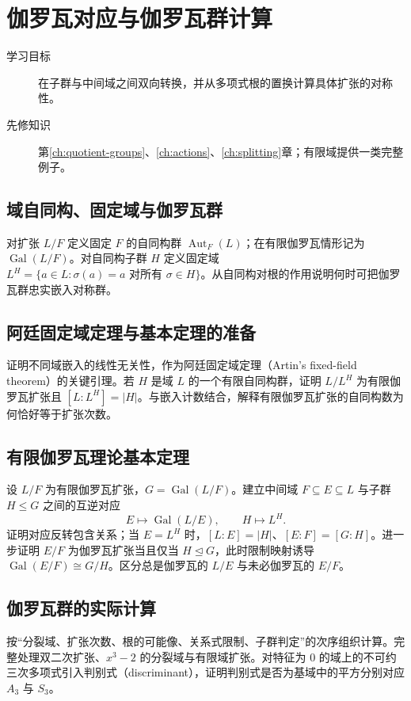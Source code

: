 \documentclass[UTF8,12pt,a4paper,fontset=fandol]{ctexbook}
\begin{document}
\chapter{伽罗瓦对应与伽罗瓦群计算}\label{ch:galois}

\begin{description}
  \item[学习目标] 在子群与中间域之间双向转换，并从多项式根的置换计算具体扩张的对称性。
  \item[先修知识] 第\ref{ch:quotient-groups}、\ref{ch:actions}、\ref{ch:splitting}章；有限域提供一类完整例子。
\end{description}

\section{域自同构、固定域与伽罗瓦群}
对扩张 $L/F$ 定义固定 $F$ 的自同构群 $\operatorname{Aut}_F(L)$；在有限伽罗瓦情形记为 $\operatorname{Gal}(L/F)$。对自同构子群 $H$ 定义固定域 $L^H=\{a\in L:\sigma(a)=a\text{ 对所有 }\sigma\in H\}$。从自同构对根的作用说明何时可把伽罗瓦群忠实嵌入对称群。

\section{阿廷固定域定理与基本定理的准备}
证明不同域嵌入的线性无关性，作为阿廷固定域定理（Artin's fixed-field theorem）的关键引理。若 $H$ 是域 $L$ 的一个有限自同构群，证明 $L/L^H$ 为有限伽罗瓦扩张且 $[L:L^H]=|H|$。与嵌入计数结合，解释有限伽罗瓦扩张的自同构数为何恰好等于扩张次数。

\section{有限伽罗瓦理论基本定理}
设 $L/F$ 为有限伽罗瓦扩张，$G=\operatorname{Gal}(L/F)$。建立中间域 $F\subseteq E\subseteq L$ 与子群 $H\leq G$ 之间的互逆对应
\begin{equation}\label{eq:galois-correspondence}
  E\longmapsto\operatorname{Gal}(L/E),
  \qquad H\longmapsto L^H.
\end{equation}
证明对应反转包含关系；当 $E=L^H$ 时，$[L:E]=|H|$、$[E:F]=[G:H]$。进一步证明 $E/F$ 为伽罗瓦扩张当且仅当 $H\trianglelefteq G$，此时限制映射诱导 $\operatorname{Gal}(E/F)\cong G/H$。区分总是伽罗瓦的 $L/E$ 与未必伽罗瓦的 $E/F$。

\section{伽罗瓦群的实际计算}
按“分裂域、扩张次数、根的可能像、关系式限制、子群判定”的次序组织计算。完整处理双二次扩张、$x^3-2$ 的分裂域与有限域扩张。对特征为 $0$ 的域上的不可约三次多项式引入判别式（discriminant），证明判别式是否为基域中的平方分别对应 $A_3$ 与 $S_3$。
\end{document}
